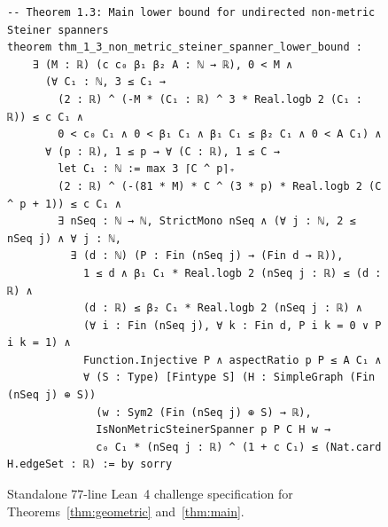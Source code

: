 \documentclass[11pt]{article}
\theoremstyle{definition}
\theoremstyle{remark}
\begin{document}
\begin{figure}[p]
\begin{lstlisting}[style=leanstyle]
-- Theorem 1.3: Main lower bound for undirected non-metric Steiner spanners
theorem thm_1_3_non_metric_steiner_spanner_lower_bound :
    ∃ (M : ℝ) (c c₀ β₁ β₂ A : ℕ → ℝ), 0 < M ∧
      (∀ C₁ : ℕ, 3 ≤ C₁ →
        (2 : ℝ) ^ (-M * (C₁ : ℝ) ^ 3 * Real.logb 2 (C₁ : ℝ)) ≤ c C₁ ∧
        0 < c₀ C₁ ∧ 0 < β₁ C₁ ∧ β₁ C₁ ≤ β₂ C₁ ∧ 0 < A C₁) ∧
      ∀ (p : ℝ), 1 ≤ p → ∀ (C : ℝ), 1 ≤ C →
        let C₁ : ℕ := max 3 ⌈C ^ p⌉₊
        (2 : ℝ) ^ (-(81 * M) * C ^ (3 * p) * Real.logb 2 (C ^ p + 1)) ≤ c C₁ ∧
        ∃ nSeq : ℕ → ℕ, StrictMono nSeq ∧ (∀ j : ℕ, 2 ≤ nSeq j) ∧ ∀ j : ℕ,
          ∃ (d : ℕ) (P : Fin (nSeq j) → (Fin d → ℝ)),
            1 ≤ d ∧ β₁ C₁ * Real.logb 2 (nSeq j : ℝ) ≤ (d : ℝ) ∧
            (d : ℝ) ≤ β₂ C₁ * Real.logb 2 (nSeq j : ℝ) ∧
            (∀ i : Fin (nSeq j), ∀ k : Fin d, P i k = 0 ∨ P i k = 1) ∧
            Function.Injective P ∧ aspectRatio p P ≤ A C₁ ∧
            ∀ (S : Type) [Fintype S] (H : SimpleGraph (Fin (nSeq j) ⊕ S))
              (w : Sym2 (Fin (nSeq j) ⊕ S) → ℝ),
              IsNonMetricSteinerSpanner p P C H w →
              c₀ C₁ * (nSeq j : ℝ) ^ (1 + c C₁) ≤ (Nat.card H.edgeSet : ℝ) := by sorry
\end{lstlisting}
\vspace{-2pt}
\caption{Standalone $77$-line Lean~4 challenge specification for Theorems~\ref{thm:geometric} and~\ref{thm:main}.}
\label{fig:lean-challenge}
\end{figure}
\end{document}
